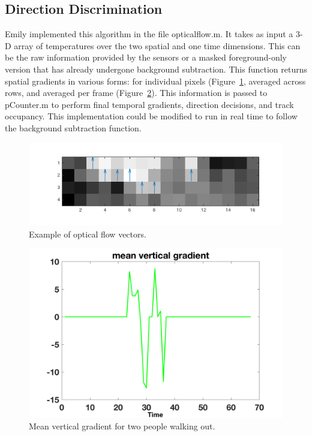 \documentclass[12pt,oneside]{article} %
\begin{document}
\subsection{Direction Discrimination}
Emily implemented this algorithm in the file opticalflow.m. It takes as input a 3-D array of temperatures over the two spatial and one time dimensions. This can be the raw information provided by the sensors or a masked foreground-only version that has already undergone background subtraction. This function returns spatial gradients in various forms: for individual pixels (Figure~\ref{opflw}, averaged across rows, and averaged per frame (Figure~\ref{twoout}). This information is passed to pCounter.m to perform final temporal gradients, direction decisions, and track occupancy. This implementation could be modified to run in real time to follow the background subtraction function.
\begin{figure}[htb]
\centering
\includegraphics[scale=0.52]{images/quiver_gradients.png}
\caption{Example of optical flow vectors.}
\label{opflw}
\end{figure}
\begin{figure}[htb]
\centering
\includegraphics[scale=0.52]{images/two_out.png}
\caption{Mean vertical gradient for two people walking out.}
\label{twoout}
\end{figure}
\end{document}
